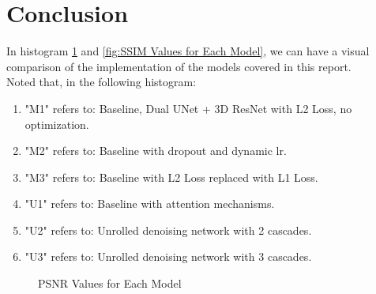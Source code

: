 \documentclass{article}
\begin{document}
\section{Conclusion}
In histogram \ref{fig:PSNR Values for Each Model} and \ref{fig:SSIM Values for Each Model}, we can have a visual comparison of the implementation of the models covered in this report.\\
Noted that, in the following histogram:
\begin{enumerate}
  \item "M1" refers to: Baseline, Dual UNet + 3D ResNet with L2 Loss, no optimization.
  \item "M2" refers to: Baseline with dropout and dynamic lr.
  \item "M3" refers to: Baseline with L2 Loss replaced with L1 Loss.
  \item "U1" refers to: Baseline with attention mechanisms.
  \item "U2" refers to: Unrolled denoising network with 2 cascades.
  \item "U3" refers to: Unrolled denoising network with 3 cascades.
\end{enumerate}

\begin{figure}[H]
  \centering
  \caption{PSNR Values for Each Model}
  \label{fig:PSNR Values for Each Model}
\end{figure}
\end{document}
